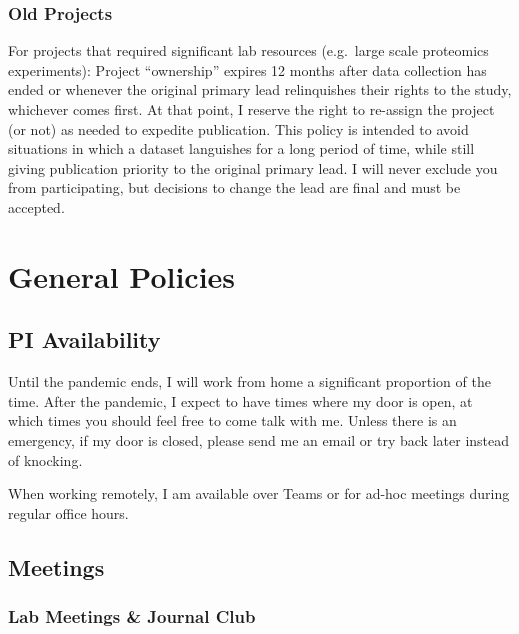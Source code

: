 \documentclass[
]{book}
\begin{document}
\hypertarget{old-projects}{%
\subsection{Old Projects}\label{old-projects}}

For projects that required significant lab resources (e.g.~large scale proteomics experiments): Project ``ownership'' expires 12 months after data collection has ended or whenever the original primary lead relinquishes their rights to the study, whichever comes first. At that point, I reserve the right to re-assign the project (or not) as needed to expedite publication. This policy is intended to avoid situations in which a dataset languishes for a long period of time, while still giving publication priority to the original primary lead. I will never exclude you from participating, but decisions to change the lead are final and must be accepted.

\hypertarget{general}{%
\chapter{General Policies}\label{general}}

\hypertarget{pi-availability}{%
\section{PI Availability}\label{pi-availability}}

Until the pandemic ends, I will work from home a significant proportion of the time. After the pandemic, I expect to have times where my door is open, at which times you should feel free to come talk with me. Unless there is an emergency, if my door is closed, please send me an email or try back later instead of knocking.

When working remotely, I am available over Teams or for ad-hoc meetings during regular office hours.

\hypertarget{meetings}{%
\section{Meetings}\label{meetings}}

\hypertarget{lab-meetings-journal-club}{%
\subsection{Lab Meetings \& Journal Club}\label{lab-meetings-journal-club}}
\end{document}
